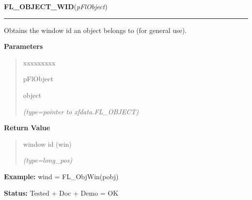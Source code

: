 \hspace{.8\funcindent}\begin{boxedminipage}{\funcwidth}

    \raggedright \textbf{FL\_OBJECT\_WID}(\textit{pFlObject})

    \vspace{-1.5ex}

    \rule{\textwidth}{0.5\fboxrule}
\setlength{\parskip}{2ex}
    Obtains the window id an object belongs to (for general use).

\setlength{\parskip}{1ex}
      \textbf{Parameters}
      \vspace{-1ex}

      \begin{quote}
        \begin{Ventry}{xxxxxxxxx}

          \item[pFlObject]

          object

            {\it (type=pointer to xfdata.FL\_OBJECT)}

        \end{Ventry}

      \end{quote}

      \textbf{Return Value}
    \vspace{-1ex}

      \begin{quote}
      window id (win)

      {\it (type=long\_pos)}

      \end{quote}

\textbf{Example:} wind = FL\_ObjWin(pobj)



\textbf{Status:} Tested + Doc + Demo = OK



    \end{boxedminipage}

    \label{xformslib:flxbasic:fl_XNextEvent}

    \vspace{0.5ex}

